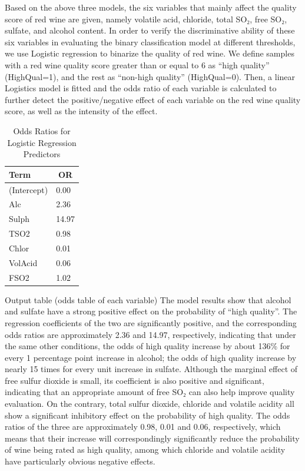 \documentclass[
  doc,floatsintext]{apa6}
\begin{document}
Based on the above three models, the six variables that mainly affect the quality score of red wine are given, namely volatile acid, chloride, total SO₂, free SO₂, sulfate, and alcohol content. In order to verify the discriminative ability of these six variables in evaluating the binary classification model at different thresholds, we use Logistic regression to binarize the quality of red wine. We define samples with a red wine quality score greater than or equal to 6 as ``high quality'' (HighQual=1), and the rest as ``non-high quality'' (HighQual=0). Then, a linear Logistics model is fitted and the odds ratio of each variable is calculated to further detect the positive/negative effect of each variable on the red wine quality score, as well as the intensity of the effect.

\begin{table}[H]

\begin{center}
\begin{threeparttable}

\caption{\label{tab:or-table}Odds Ratios for Logistic Regression Predictors}

\begin{tabular}{ll}
\toprule
Term & \multicolumn{1}{c}{OR}\\
\midrule
(Intercept) & 0.00\\
Alc & 2.36\\
Sulph & 14.97\\
TSO2 & 0.98\\
Chlor & 0.01\\
VolAcid & 0.06\\
FSO2 & 1.02\\
\bottomrule
\end{tabular}

\end{threeparttable}
\end{center}

\end{table}

Output table (odds table of each variable)
The model results show that alcohol and sulfate have a strong positive effect on the probability of ``high quality''. The regression coefficients of the two are significantly positive, and the corresponding odds ratios are approximately 2.36 and 14.97, respectively, indicating that under the same other conditions, the odds of high quality increase by about 136\% for every 1 percentage point increase in alcohol; the odds of high quality increase by nearly 15 times for every unit increase in sulfate. Although the marginal effect of free sulfur dioxide is small, its coefficient is also positive and significant, indicating that an appropriate amount of free SO₂ can also help improve quality evaluation. On the contrary, total sulfur dioxide, chloride and volatile acidity all show a significant inhibitory effect on the probability of high quality. The odds ratios of the three are approximately 0.98, 0.01 and 0.06, respectively, which means that their increase will correspondingly significantly reduce the probability of wine being rated as high quality, among which chloride and volatile acidity have particularly obvious negative effects.
\end{document}
